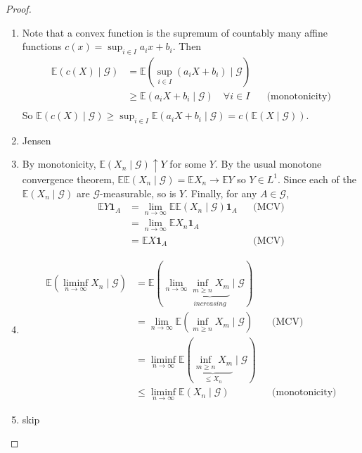 \documentclass[parskip=full]{article}
\theoremstyle{definition}
\newcommand{\1}{\mathbbm{1}}
\newcommand{\E}{\mathbb{E}}
\begin{document}
  \begin{proof}
    \begin{enumerate}
        \item Note that a convex function is the supremum of countably many affine functions $c(x) = \sup_{i \in I} a_i x + b_i$. Then
        \begin{align*}
            \E(c(X) \mid \mathcal{G}) &= \E \left(\sup_{i \in I}\left( a_i X + b_i \right)\mid \mathcal{G} \right)\\
            &\geq \E(a_i X + b_i \mid \mathcal{G}) \quad \forall i \in I &&\text{(monotonicity)}\\
        \end{align*} 
        So $\E(c(X) \mid \mathcal{G}) \geq \sup_{i \in I} \E(a_i X + b_i \mid \mathcal{G}) = c(\E(X \mid \mathcal{G}))$.
        \item Jensen
        \item By monotonicity, $\E(X_n \mid \mathcal{G}) \uparrow Y$ for some $Y$. By the usual monotone convergence theorem, $\E \E (X_n \mid \mathcal{G}) = \E X_n \to \E Y$ so $Y \in L^1$. Since each of the $\E (X_n \mid \mathcal{G})$ are $\mathcal{G}$-measurable, so is $Y$. Finally, for any $A \in \mathcal{G}$, 
        \begin{align*}
            \E Y \mathbf{1}_A &= \lim_{n \to \infty} \E \E(X_n \mid \mathcal{G}) \mathbf{1}_A &&\text{(MCV)}\\
            &= \lim_{n \to \infty} \E X_n \mathbf{1}_A\\
            &= \E X \mathbf{1}_A &&\text{(MCV)}
        \end{align*}
        \item \begin{align*}
            \E \left (\liminf_{n \to \infty} X_n \mid \mathcal{G} \right) &= \E \left (\lim_{n \to \infty} \underbrace{\inf_{m \geq n} X_m}_{increasing} \mid \mathcal{G} \right)\\
            &= \lim_{n \to \infty} \E \left (\inf_{m \geq n} X_m \mid \mathcal{G} \right) &&\text{(MCV)}\\
            &= \liminf_{n \to \infty} \E \left (\underbrace{\inf_{m \geq n} X_m}_{\leq X_n} \mid \mathcal{G}\right)\\
            &\leq \liminf_{n \to \infty}\E(X_n \mid \mathcal{G}) &&\text{(monotonicity)}
        \end{align*}
        \item skip
    \end{enumerate}
  \end{proof}
\end{document}
